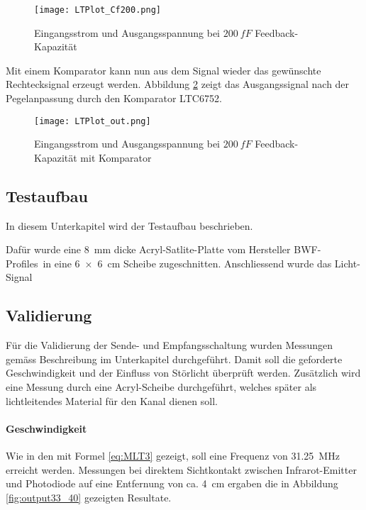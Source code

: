 \begin{figure}[H]
	\centering
	\texttt{[image: LTPlot\_Cf200.png]}
	\caption{Eingangsstrom und Ausgangsspannung bei $\SI{200}{fF}$ Feedback-Kapazität}\label{fig:Plot_Cf200}
\end{figure}

Mit einem Komparator kann nun aus dem Signal wieder das gewünschte Rechtecksignal erzeugt werden. Abbildung \ref{fig:Plot_out} zeigt das Ausgangssignal nach der Pegelanpassung durch den Komparator LTC6752.

\begin{figure}[H]
	\centering
	\texttt{[image: LTPlot\_out.png]}
	\caption{Eingangsstrom und Ausgangsspannung bei $\SI{200}{fF}$ Feedback-Kapazität mit Komparator}\label{fig:Plot_out}
\end{figure}




\subsection{Testaufbau}
\label{subsec:Testaufbau}
In diesem Unterkapitel wird der Testaufbau beschrieben.

Dafür wurde eine \SI{8}{mm} dicke Acryl-Satlite-Platte vom Hersteller \glqq BWF-Profiles\grqq\  in eine \SI{6x6}{cm} Scheibe zugeschnitten. Anschliessend wurde das Licht-Signal

\subsection{Validierung} 

Für die Validierung der Sende- und Empfangsschaltung wurden Messungen gemäss Beschreibung im Unterkapitel  durchgeführt. Damit soll die geforderte Geschwindigkeit und der Einfluss von Störlicht überprüft werden. Zusätzlich wird eine Messung durch eine Acryl-Scheibe durchgeführt, welches später als lichtleitendes Material für den Kanal dienen soll.
 
\paragraph{Geschwindigkeit}
Wie in den  mit Formel \ref{eq:MLT3} gezeigt, soll eine Frequenz von \SI{31.25}{MHz} erreicht werden. Messungen bei direktem Sichtkontakt zwischen Infrarot-Emitter und Photodiode auf eine Entfernung von ca. \SI{4}{cm} ergaben die in Abbildung \ref{fig:output33_40} gezeigten Resultate.

